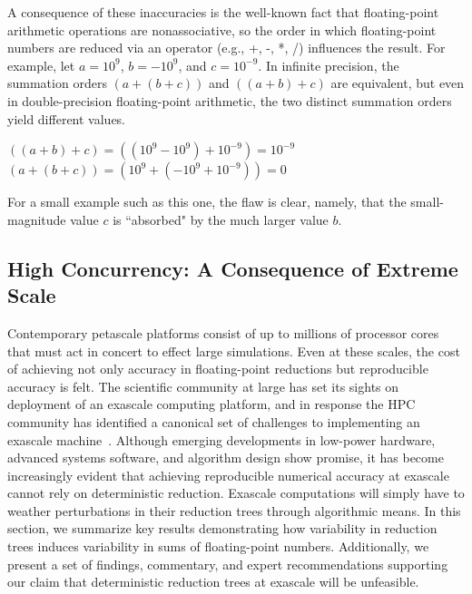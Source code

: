 A consequence of these inaccuracies is the well-known fact that
floating-point arithmetic operations are nonassociative, so the order
in which floating-point numbers are reduced via an operator (e.g., +,
-, *, /) influences the result.  For example, let $a = 10^9$, $b =
-10^{9}$, and $c = 10^{-9}$. In infinite precision, the summation
orders $(a + (b + c))$ and $((a+b) +c)$ are equivalent, but even in
double-precision floating-point arithmetic, the two distinct summation
orders yield different values.
\begin{center}
	$((a + b) + c) = ((10^9 - 10^9) + 10^{-9}) = 10^{-9}$ \\
	$(a + (b + c)) = (10^9 + (-10^9 + 10^{-9})) = 0$ 
\end{center}
For a small example such as this one, the flaw is clear, namely, that
the small-magnitude value $c$ is ``absorbed" by the much larger value
$b$.

\subsection{High Concurrency: A Consequence of Extreme Scale}

Contemporary petascale platforms consist of up to millions of
processor cores that must act in concert to effect large
simulations. Even at these scales, the cost of achieving not only
accuracy in floating-point reductions but reproducible accuracy is
felt. The scientific community at large has set its sights on
deployment of an exascale computing platform, and in response the HPC
community has identified a canonical set of challenges to implementing
an exascale machine~\cite{Doe2014}. Although emerging developments in
low-power hardware, advanced systems software, and algorithm design
show promise, it has become increasingly evident that achieving
reproducible numerical accuracy at exascale cannot rely on
deterministic reduction. Exascale computations will simply have to
weather perturbations in their reduction trees through algorithmic
means. In this section, we summarize key results demonstrating how
variability in reduction trees induces variability in sums of
floating-point numbers. Additionally, we present a set of findings,
commentary, and expert recommendations supporting our claim that
deterministic reduction trees at exascale will be unfeasible.

